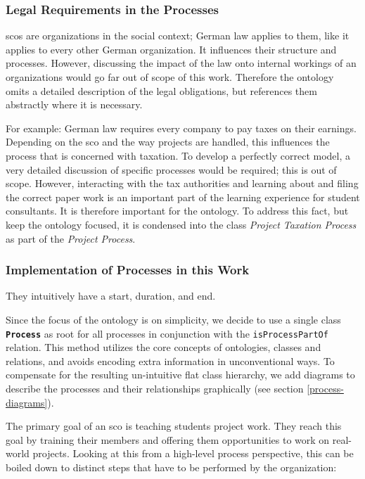 \documentclass[a4paper, DIV=13, BCOR=0cm]{scrbook}
\newcommand{\class}[1]{\texttt{\textbf{#1}}}
\newcommand{\relation}[1]{\texttt{#1}}
\begin{document}
\subsubsection{Legal Requirements in the Processes }
\glspl{sco} are organizations in the social context; German law applies to them, like it applies to every other German organization. It influences their structure and processes. However, discussing the impact of the law onto internal workings of an organizations would go far out of scope of this work. Therefore the ontology omits a detailed description of the legal obligations, but references them abstractly where it is necessary.

For example: German law requires every company to pay taxes on their earnings. Depending on the \gls{sco} and the way projects are handled, this influences the process that is concerned with taxation. To develop a perfectly correct model, a very detailed discussion of specific processes would be required; this is out of scope. However, interacting with the tax authorities and learning about and filing the correct paper work is an important part of the learning experience for student consultants. It is therefore important for the ontology. To address this fact, but keep the ontology focused, it is condensed into the class \textit{Project Taxation Process} as part of the \textit{Project Process}.


\subsubsection{Implementation of Processes in this Work }
They intuitively have a start, duration, and end. 

Since the focus of the ontology is on simplicity, we decide to use a single  class \class{Process} as root for all processes in conjunction with the \relation{isProcessPartOf} relation. This method utilizes the core concepts of ontologies, classes and relations, and avoids encoding extra information in unconventional ways. To compensate for the resulting un-intuitive flat class hierarchy, we add diagrams to describe the processes and their relationships graphically (see section \ref{process-diagrams}).

The primary goal of an \gls{sco} is teaching students project work. They reach this goal by training their members and offering them opportunities to work on real-world projects. Looking at this from a high-level process perspective, this can be boiled down to distinct steps that have to be performed by the organization:
\end{document}
